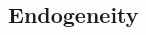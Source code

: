 \documentclass[10pt, a4paper, landscape]{extarticle}
\begin{document}
\begin{multicols}{3}
\section*{Endogeneity}

\end{multicols}
\end{document}
